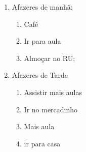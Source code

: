 \documentclass{article}
\begin{document}
%
\begin{enumerate}
  \item Afazeres de manhã:
    \begin{enumerate}[label=\alph*.] %
      \item Café
      \item Ir para aula
      \item Almoçar no RU;
    \end{enumerate}
  \item Afazeres de Tarde
    \begin{enumerate}[label=\alph*.] %
      \item Assistir mais aulas
      \item Ir no mercadinho
      \item Mais aula
      \item ir para casa
    \end{enumerate}
\end{enumerate}
\end{document}
